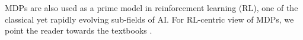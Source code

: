 MDPs are also used as a prime model in reinforcement learning (RL), one of the classical yet rapidly evolving sub-fields of AI. For RL-centric view of MDPs, we point the reader towards the textbooks \cite{Sutton&Barto:2018,Bertsekas:2017}.









%
%
%
%
%
%
%
